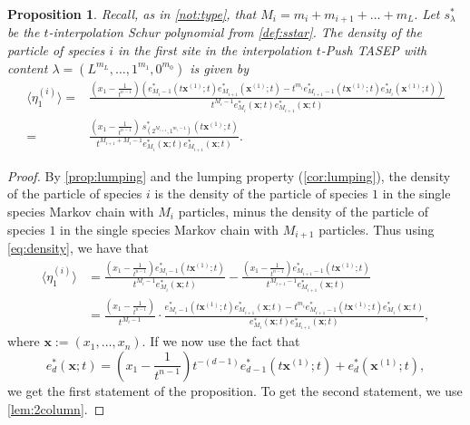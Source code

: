 \documentclass[12pt]{amsart}
\newtheorem{prop}[thm]{Proposition}
\theoremstyle{definition}
\newcommand{\bfx}{\boldsymbol{x}}
\begin{document}
\begin{prop}\label{prop:density}
Recall, as in \cref{not:type}, that  $M_i = m_i+m_{i+1} + \dots + m_L.$  Let $s^*_{\lambda}$ be the $t$-interpolation Schur polynomial from \cref{def:sstar}.
   The density of the particle of species $i$ in the first site in 
   the interpolation $t$-Push TASEP with content $\lambda=(L^{m_L}, \dots, 1^{m_1}, 0^{m_0})$ is given by
   \small{
   \begin{align*}
       \langle \eta_1^{(i)} \rangle =&
       \frac{(x_1-\frac{1}{t^{n-1}}) \left(e_{M_i-1}^*\left(t\bfx^{(1)};t\right) e^*_{M_{i+1}}\left(\bfx^{(1)};t\right)  - t^{m_i} e_{M_{i+1}-1}^*\left(t\bfx^{(1)};t\right) e_{M_i}^*\left(\bfx^{(1)};t\right) \right)}{t^{M_{i}-1} e^*_{M_i}\left(\bfx;t\right) e^*_{M_{i+1}}\left(\bfx;t\right)} \\
       =&
       \frac{(x_1-\frac{1}{t^{n-1}}) 
       \ s^*_{(2^{M_{i+1}},1^{m_i-1})}\left(t\bfx^{(1)};t\right)
       }{t^{M_{i+1}+M_i-1} e^*_{M_i}\left(\bfx;t\right)e^*_{M_{i+1}}\left(\bfx;t\right)}.
   \end{align*}}
\end{prop}

\begin{proof}
By \cref{prop:lumping} and the lumping property (\cref{cor:lumping}),  the density of the particle
    of species $i$ is the density of the particle of species $1$ in the single species
    Markov chain with $M_i$ particles, minus the density of the particle of species $1$
    in the single species Markov chain with $M_{i+1}$ particles.
    Thus using \cref{eq:density}, we have that 
     \begin{align*}
       \langle \eta_1^{(i)} \rangle &= 
       \frac{(x_1-\frac{1}{t^{n-1}}) e^*_{M_i-1}\left(t\bfx^{(1)};t\right)}{t^{M_i-1} e^*_{M_i}(\bfx;t)}  - \frac{(x_1-\frac{1}{t^{n-1}}) e^*_{M_{i+1}-1}\left(t\bfx^{(1)};t\right)}{t^{M_{i+1}-1} e^*_{M_{i+1}}(\bfx;t)} \\
       &= \frac{(x_1-\frac{1}{t^{n-1}})}{t^{M_{i}-1}} \cdot 
       \frac{e^*_{M_i-1}\left(t\bfx^{(1)};t\right) e^*_{M_{i+1}}(\bfx;t)-t^{m_i} e^*_{M_{i+1}-1}\left(t\bfx^{(1)};t\right) e^*_{M_i}(\bfx;t)}{e^*_{M_i}(\bfx;t) e^*_{M_{i+1}}(\bfx;t)}, \label{eq:sofar}
   \end{align*}
   where $\bfx:=(x_1,\dots,x_n)$.
If we now use the fact that 
\begin{equation}
e^*_d(\bfx;t) = \left(x_1-\frac{1}{t^{n-1}}\right) t^{-(d-1)} e^*_{d-1}\left(t\bfx^{(1)};t\right) + e^*_d\left(\bfx^{(1)};t\right),    
\end{equation}
we get the first statement of the proposition.  To get the second statement, we use \cref{lem:2column}.
\end{proof}
\end{document}
